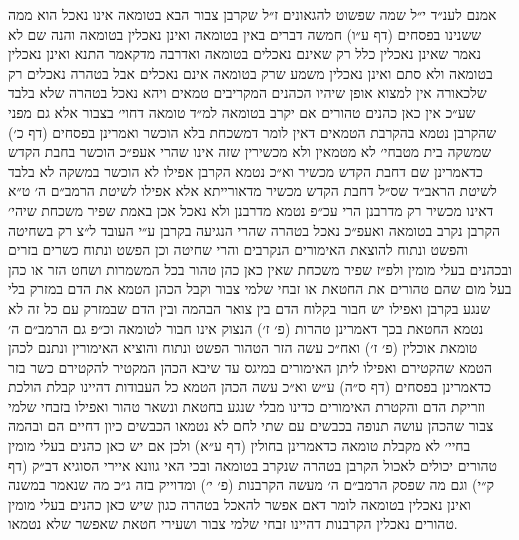 \documentclass[12pt, openany]{book}
\begin{document}
\begin{multicols}{2}
אמנם לענ״ד י״ל שמה שפשוט להגאונים ז״ל שקרבן צבור הבא בטומאה אינו נאכל הוא ממה ששנינו בפסחים (דף ע״ו) חמשה דברים באין בטומאה ואינן נאכלין בטומאה והנה שם לא נאמר שאינן נאכלין כלל רק שאינם נאכלים בטומאה ואדרבה מדקאמר התנא ואינן נאכלין בטומאה ולא סתם ואינן נאכלין משמע שרק בטומאה אינם נאכלים אבל בטהרה נאכלים רק שלכאורה אין למצוא אופן שיהיו הכהנים המקריבים טמאים ויהא נאכל בטהרה שלא בלבד שע״כ אין כאן כהנים טהורים אם יקרב בטומאה למ״ד טומאה דחוי׳ בצבור אלא גם מפני שהקרבן נטמא בהקרבת הטמאים דאין לומר דמשכחת בלא הוכשר ואמרינן בפסחים (דף כ׳) שמשקה בית מטבחי׳ לא מטמאין ולא מכשירין שזה אינו שהרי אעפ״כ הוכשר בחבת הקדש כדאמרינן שם דחבת הקדש מכשיר וא״כ נטמא הקרבן אפילו לא הוכשר במשקה לא בלבד לשיטת הראב״ד שס״ל דחבת הקדש מכשיר מדאורייתא אלא אפילו לשיטת הרמב״ם ה׳ ט״א דאינו מכשיר רק מדרבנן הרי עכ״פ נטמא מדרבנן ולא נאכל אכן באמת שפיר משכחת שיהי׳ הקרבן נקרב בטומאה ואעפ״כ נאכל בטהרה שהרי הנגיעה בקרבן ע״י העובד ל״צ רק בשחיטה והפשט ונתוח להוצאת האימורים הנקרבים והרי שחיטה וכן הפשט ונתוח כשרים בזרים ובכהנים בעלי מומין ולפ״ז שפיר משכחת שאין כאן כהן טהור בכל המשמרות ושחט הזר או כהן בעל מום שהם טהורים את החטאת או זבחי שלמי צבור וקבל הכהן הטמא את הדם במזרק בלי שנגע בקרבן ואפילו יש חבור בקלוח הדם בין צואר הבהמה ובין הדם שבמזרק עם כל זה לא נטמא החטאת בכך דאמרינן טהרות (פ׳ ז׳) הנצוק אינו חבור לטומאה וכ״פ גם הרמב״ם ה׳ טומאת אוכלין (פ׳ ז׳) ואח״כ עשה הזר הטהור הפשט ונתוח והוציא האימורין ונתנם לכהן הטמא שהקטירם ואפילו ליתן האימורים במיגס עד שיבא הכהן המקטיר להקטירם כשר בזר כדאמרינן בפסחים (דף ס״ה) ע״ש וא״כ עשה הכהן הטמא כל העבודות דהיינו קבלת הולכת וזריקת הדם והקטרת האימורים כדינו מבלי שנגע בחטאת ונשאר טהור ואפילו בזבחי שלמי צבור שהכהן עושה תנופה בכבשים עם שתי לחם לא נטמאו הכבשים כיון דחיים הם ובהמה בחיי׳ לא מקבלת טומאה כדאמרינן בחולין (דף ע״א) ולכן אם יש כאן כהנים בעלי מומין טהורים יכולים לאכול הקרבן בטהרה שנקרב בטומאה ובכי האי גוונא איירי הסוגיא דב״ק (דף ק״י) וגם מה שפסק הרמב״ם ה׳ מעשה הקרבנות (פ׳ י׳) ומדוייק בזה ג״כ מה שנאמר במשנה ואינן נאכלין בטומאה לומר דאם אפשר להאכל בטהרה כגון שיש כאן כהנים בעלי מומין טהורים נאכלין הקרבנות דהיינו זבחי שלמי צבור ושעירי חטאת שאפשר שלא נטמאו.\\\vspace{0pt}


\end{multicols}
\end{document}
